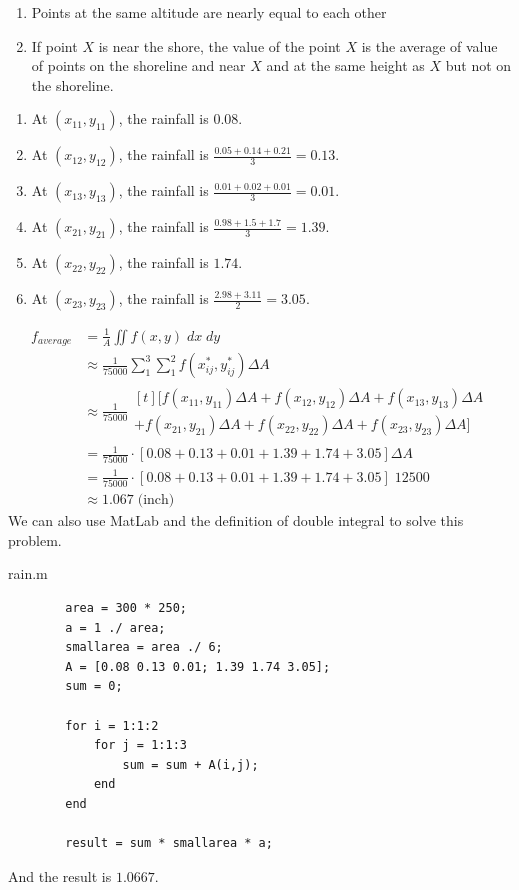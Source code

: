 \documentclass[a4paper]{article}
\begin{document}
\begin{enumerate}[label=$\cdot$]
	\item Points at the same altitude are nearly equal to each other
	\item If point $X$ is near the shore, the value of the point $X$ is the average of value of points on the shoreline and near $X$ and at the same height as $X$ but not on the shoreline.
\end{enumerate}
\begin{enumerate}[label=$\bullet$]
	\item At $(x_{11}, y_{11})$, the rainfall is $0.08$.
	\item At $(x_{12}, y_{12})$, the rainfall is $\frac{0.05+0.14+0.21}{3}=0.13$.
	\item At $(x_{13}, y_{13})$, the rainfall is $\frac{0.01+0.02+0.01}{3}=0.01$.
	\item At $(x_{21}, y_{21})$, the rainfall is $\frac{0.98+1.5+1.7}{3}=1.39$.
	\item At $(x_{22}, y_{22})$, the rainfall is $1.74$.
	\item At $(x_{23}, y_{23})$, the rainfall is $\frac{2.98+3.11}{2}=3.05$.
\end{enumerate}
\begin{align*}
	f_{average} & = \frac{1}{A}\iint f(x,y)\;dx\;dy                                                    \\
	            & \approx \frac{1}{75000} \sum_{1}^{3} \sum_{1}^{2} f(x_{ij}^{*}, y_{ij}^{*}) \Delta A \\
	            & \approx \frac{1}{75000} \begin{multlined}[t]
		\bigl[f(x_{11}, y_{11}) \Delta A + f(x_{12}, y_{12}) \Delta A + f(x_{13}, y_{13}) \Delta A \\
			+ f(x_{21}, y_{21}) \Delta A + f(x_{22}, y_{22}) \Delta A + f(x_{23}, y_{23}) \Delta A\bigr]
	\end{multlined}                               \\
	            & = \frac{1}{75000} \cdot [0.08 + 0.13 + 0.01 + 1.39 + 1.74 + 3.05] \Delta A           \\
	            & = \frac{1}{75000} \cdot [0.08 + 0.13 + 0.01 + 1.39 + 1.74 + 3.05]\; 12500            \\
	            & \approx 1.067\;\text{(inch)}
\end{align*}
We can also use MatLab and the definition of double integral to solve this problem.
\begin{mdframed}[hidealllines=true,backgroundcolor=magenta!10]
	rain.m
	\begin{lstlisting}
		area = 300 * 250;
		a = 1 ./ area;
		smallarea = area ./ 6;
		A = [0.08 0.13 0.01; 1.39 1.74 3.05];
		sum = 0;
		
		for i = 1:1:2
			for j = 1:1:3
				sum = sum + A(i,j);
			end
		end
		
		result = sum * smallarea * a;
		\end{lstlisting}
\end{mdframed}
And the result is $1.0667$.
\end{document}
